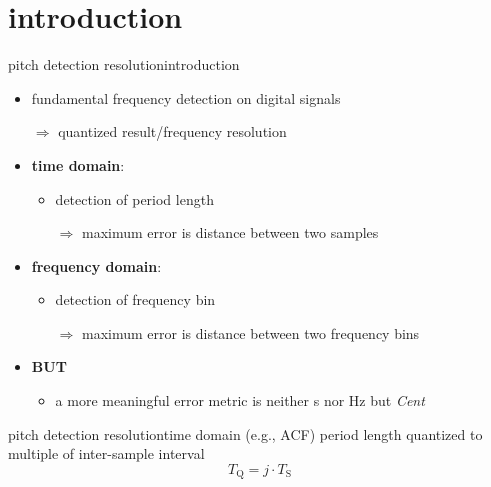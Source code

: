     \section[intro]{introduction}
        \begin{frame}{pitch detection resolution}{introduction}
            \begin{itemize}
                \item fundamental frequency detection on digital signals
                \item[$\Rightarrow$] quantized result/frequency resolution
            \end{itemize}
            
            
            \begin{itemize}
                \item   \textbf{time domain}:
                    \begin{itemize}
                        \item   detection of period length
                        \item[$\Rightarrow$] maximum error is distance between two samples
                    \end{itemize}
                \item<3->   \textbf{frequency domain}:
                    \begin{itemize}
                        \item detection of frequency bin
                        \item[$\Rightarrow$] maximum error is distance between two frequency bins
                    \end{itemize}
                \bigskip
                \item<4->[] \textbf{BUT}
                    \begin{itemize}
                        \item<5->   a more meaningful error metric is neither \unit{s} nor \unit{Hz} but \textit{Cent}
                    \end{itemize}
            \end{itemize}
        \end{frame}
        \begin{frame}{pitch detection resolution}{time domain (e.g., ACF)}
            period length quantized to multiple of inter-sample interval 
            \begin{equation*}
                T_\mathrm{Q} = j\cdot T_{\mathrm{S}}
            \end{equation*}
        \end{frame}
